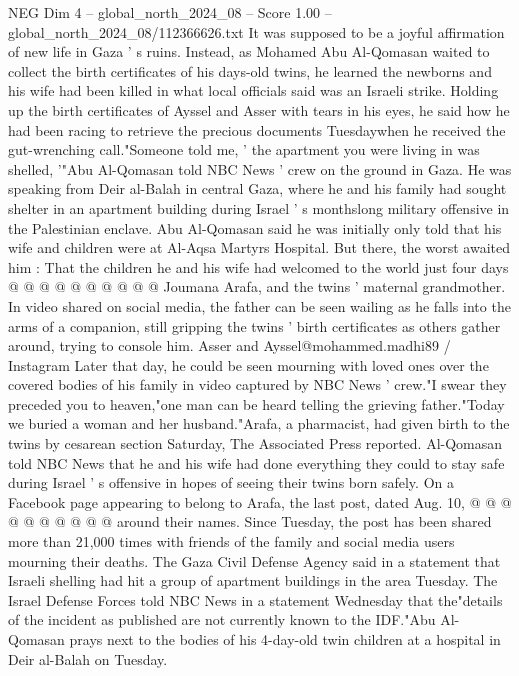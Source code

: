 \begin{textsample}{NEG Dim 4 – global\_north\_2024\_08 – Score 1.00 – global\_north\_2024\_08/112366626.txt}  \label{ex:f4_neg_306}
It was supposed to be a joyful affirmation of new life in Gaza ' s ruins.
Instead, as Mohamed Abu Al-Qomasan waited to collect the birth certificates of his days-old twins, he learned the newborns and his wife had been killed in what local officials said was an Israeli strike.
Holding up the birth certificates of Ayssel and Asser with tears in his eyes, he said how he had been racing to retrieve the precious documents Tuesdaywhen he received the gut-wrenching call."Someone told me, ' the apartment you were living in was shelled, '"Abu Al-Qomasan told NBC News ' crew on the ground in Gaza.
He was speaking from Deir al-Balah in central Gaza, where he and his family had sought shelter in an apartment building during Israel ' s monthslong military offensive in the Palestinian enclave.
Abu Al-Qomasan said he was initially only told that his wife and children were at Al-Aqsa Martyrs Hospital.
But there, the worst awaited him : That the children he and his wife had welcomed to the world just four days @ @ @ @ @ @ @ @ @ @ Joumana Arafa, and the twins ' maternal grandmother.
In video shared on social media, the father can be seen wailing as he falls into the arms of a companion, still gripping the twins ' birth certificates as others gather around, trying to console him.
Asser and Ayssel@mohammed.madhi89 / Instagram Later that day, he could be seen mourning with loved ones over the covered bodies of his family in video captured by NBC News ' crew."I swear they preceded you to heaven,"one man can be heard telling the grieving father."Today we buried a woman and her husband."Arafa, a pharmacist, had given birth to the twins by cesarean section Saturday, The Associated Press reported.
Al-Qomasan told NBC News that he and his wife had done everything they could to stay safe during Israel ' s offensive in hopes of seeing their twins born safely.
On a Facebook page appearing to belong to Arafa, the last post, dated Aug. 10, @ @ @ @ @ @ @ @ @ @ around their names.
Since Tuesday, the post has been shared more than 21,000 times with friends of the family and social media users mourning their deaths.
The Gaza Civil Defense Agency said in a statement that Israeli shelling had hit a group of apartment buildings in the area Tuesday.
The Israel Defense Forces told NBC News in a statement Wednesday that the"details of the incident as published are not currently known to the IDF."Abu Al-Qomasan prays next to the bodies of his 4-day-old twin children at a hospital in Deir al-Balah on Tuesday.

\end{textsample}
